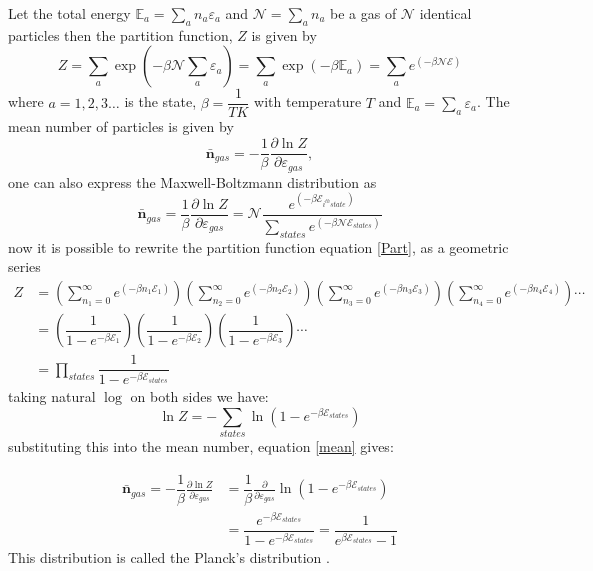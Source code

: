 \documentclass[pdflatex,sn-mathphys-num]{sn-jnl}%
\theoremstyle{thmstyleone}%
\theoremstyle{thmstyletwo}%
\theoremstyle{thmstylethree}%
\begin{document}
Let the total energy $\mathbb{E}_a=\sum_a n_a \varepsilon_a$ and $\mathcal{N}=\sum_a n_a$ be 
 a gas of $\mathcal{N}$ identical particles then the partition function, $Z$ is given by 
\begin{equation}\label{Part}
    Z=\sum_a \exp{(-\beta \mathcal{N} \sum_a \varepsilon_a)}=\sum_a \exp{(-\beta \mathbb{E}_a )}=\sum_a e^{(-\beta \mathcal{N} \mathcal{E})}
\end{equation}
where $a=1,2,3\ldots$ is the state, $\beta=\dfrac{1}{TK}$ with temperature $T$ and $\mathbb{E}_a=\sum_a \varepsilon_a$.
The mean number of particles is given by
\begin{equation}\label{mean}
    \bar{\mathbf{n}}_{gas}=-\dfrac{1}{\beta}\frac{\partial \ln{Z}}{\partial \varepsilon_{gas}},
\end{equation}
one can also express the Maxwell-Boltzmann distribution \cite{planck1901law} as
\begin{equation}
    \bar{\mathbf{n}}_{gas}=\dfrac{1}{\beta}\frac{\partial \ln{Z}}{\partial \varepsilon_{gas}}=\mathcal{N}\dfrac{e^{(-\beta \mathcal{E}_{i^{th}state})}}{\sum_{states} e^{(-\beta \mathcal{N} \mathcal{E}_{states})}}
\end{equation}
now it is possible to rewrite the partition function equation \ref{Part}, as a geometric series
\begin{align*}
    Z&=\left(\sum_{n_1=0}^{\infty} e^{(-\beta n_1 \mathcal{E}_1)}\right)\left(\sum_{n_2=0}^{\infty} e^{(-\beta n_2 \mathcal{E}_2)}\right)\left(\sum_{n_3=0}^{\infty} e^{(-\beta n_3 \mathcal{E}_3)}\right)\left(\sum_{n_4=0}^{\infty} e^{(-\beta n_4 \mathcal{E}_4)}\right)\cdots\\
    &=\left(\dfrac{1}{1- e^{-\beta \mathcal{E}_1}}\right)\left(\dfrac{1}{1- e^{-\beta \mathcal{E}_2}}\right)\left(\dfrac{1}{1- e^{-\beta \mathcal{E}_3}}\right)\cdots\\
    &=\prod_{states}\dfrac{1}{1- e^{-\beta \mathcal{E}_{states}}}
\end{align*}
taking natural $\log$ on both sides we have:
\begin{equation}
    \ln{Z}= -\sum_{states} \ln{(1-e^{-\beta \mathcal{E}_{states}})}
\end{equation}
substituting this into the mean number, equation \ref{mean} gives:

\begin{align}
    \bar{\mathbf{n}}_{gas}=-\dfrac{1}{\beta}\frac{\partial \ln{Z}}{\partial \varepsilon_{gas}}&=\dfrac{1}{\beta}\frac{\partial}{\partial \varepsilon_{gas}} \ln{(1-e^{-\beta \mathcal{E}_{states}})}\\\nonumber
    &= \dfrac{e^{-\beta \mathcal{E}_{states}}}{1- e^{-\beta \mathcal{E}_{states}}}=\dfrac{1}{e^{\beta \mathcal{E}_{states}}-1}
\end{align}
This distribution is called the Planck's distribution \cite{planck1901law, planck1900theory, shinde2025large, greiner2012thermodynamics}.
\end{document}
